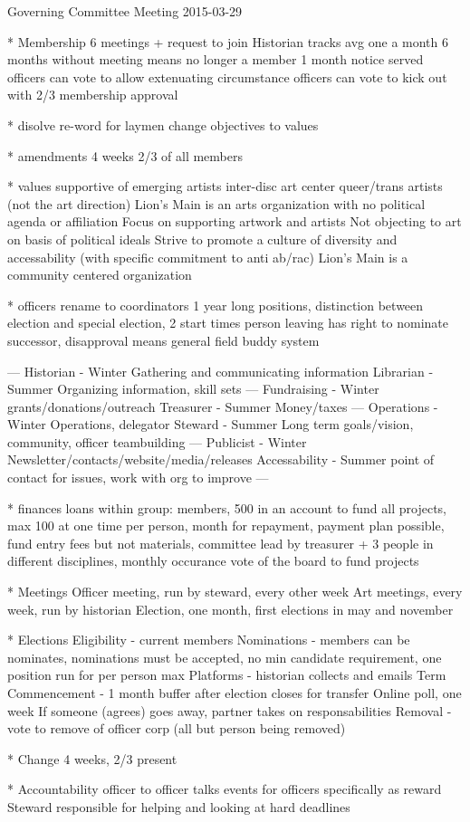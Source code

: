 Governing Committee Meeting 2015-03-29

* Membership
6 meetings + request to join
Historian tracks
avg one a month
6 months without meeting means no longer a member
1 month notice served
officers can vote to allow extenuating circumstance
officers can vote to kick out with 2/3 membership approval

* disolve
re-word for laymen
change objectives to values

* amendments
4 weeks
2/3 of all members

* values
supportive of emerging artists
inter-disc art
center queer/trans artists (not the art direction)
Lion's Main is an arts organization with no political agenda or affiliation
Focus on supporting artwork and artists
Not objecting to art on basis of political ideals
Strive to promote a culture of diversity and accessability (with specific commitment to anti ab/rac)
Lion's Main is a community centered organization

* officers
rename to coordinators
1 year long positions, distinction between election and special election, 2 start times
person leaving has right to nominate successor, disapproval means general field
buddy system

---
Historian - Winter
  Gathering and communicating information
Librarian - Summer
  Organizing information, skill sets
---
Fundraising - Winter
  grants/donations/outreach
Treasurer - Summer
  Money/taxes
---
Operations - Winter
  Operations, delegator
Steward - Summer
  Long term goals/vision, community, officer teambuilding
---
Publicist - Winter
  Newsletter/contacts/website/media/releases
Accessability - Summer
  point of contact for issues, work with org to improve
---

* finances
loans within group: members, 500 in an account to fund all projects, max 100 at one time per person, month for repayment, payment plan possible, fund entry fees but not materials, committee lead by treasurer + 3 people in different disciplines, monthly occurance
vote of the board to fund projects

* Meetings
Officer meeting, run by steward, every other week
Art meetings, every week, run by historian
Election, one month, first elections in may and november

* Elections
Eligibility - current members
Nominations - members can be nominates, nominations must be accepted, no min candidate requirement, one position run for per person max
Platforms - historian collects and emails
Term Commencement - 1 month buffer after election closes for transfer
Online poll, one week
If someone (agrees) goes away, partner takes on responsabilities
Removal - vote to remove of officer corp (all but person being removed)

* Change
4 weeks, 2/3 present

* Accountability
officer to officer talks
events for officers specifically as reward
Steward responsible for helping and looking at hard deadlines

